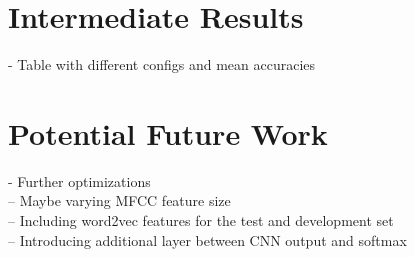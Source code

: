 \documentclass[a0,landscape]{a0poster}
\begin{document}
\begin{multicols}{3}

\color{Black} %

\section*{Intermediate Results}
- Table with different configs and mean accuracies\\

\section*{Potential Future Work}
- Further optimizations\\
-- Maybe varying MFCC feature size\\
-- Including word2vec features for the test and development set\\
-- Introducing additional layer between CNN output and softmax\\

%
%
%
%
%

\end{multicols}
\end{document}
